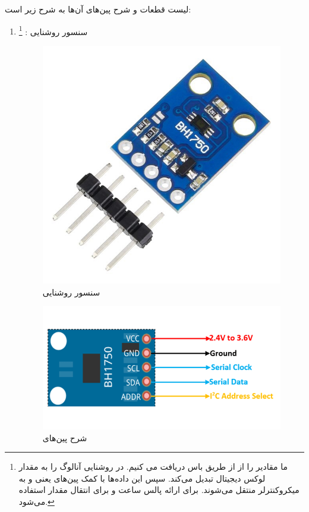 \documentclass[12pt,a4paper]{article}
\begin{document}
	لیست قطعات و شرح پین‌های آن‌ها به شرح زیر است:
	\begin{enumerate}
		\item {
			سنسور روشنایی : 
			\footnote{	ما مقادیر  را از  از طریق باس  دریافت می کنیم.  در  روشنایی آنالوگ را به مقدار لوکس دیجیتال تبدیل می‌کند. سپس این داده‌ها با کمک پین‌های  یعنی  و  به میکروکنترلر منتقل می‌شوند.  برای ارائه پالس ساعت و  برای انتقال مقدار  استفاده می‌شود.}}
		
		\begin{figure}[H]
			\centering
			\includegraphics[scale=0.2]{figs/BH1750FVI.jpeg}
			\caption{
				سنسور روشنایی 
			}
			\label{fig:schema}
		\end{figure}
		
		\begin{figure}[H]
			\centering
			\includegraphics[scale=0.3]{figs/BH1750-Light-Sensor-Pinout.png}
			\caption{
				شرح پین‌های 
			}
			\label{fig:schema}
		\end{figure}
		

\end{enumerate}
\end{document}
